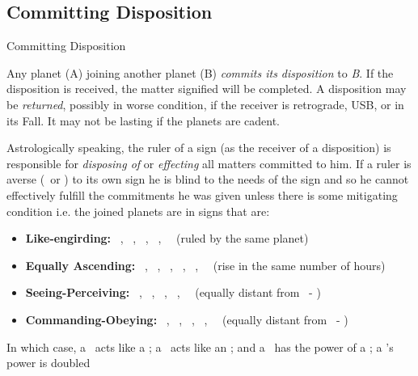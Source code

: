 \subsection{Committing Disposition}
\begin{frame}[t]{Committing Disposition}
\small
\begin{block}{}
Any planet (A) joining another planet (B) \textsl{commits its disposition} to \textsl{B}. If the disposition is received, the matter signified will be completed. A disposition may be \textsl{returned}, possibly in worse condition, if the receiver is retrograde, USB, or in its Fall.  It may not be lasting if the planets are cadent.
\end{block}

Astrologically speaking, the ruler of a sign (as the receiver of a disposition) is responsible for \textsl{disposing of} or \textsl{effecting} all matters committed to him. If a ruler is averse (\Semisextile\ or \Quincunx) to its own sign he is blind to the needs of the sign  and so he cannot effectively fulfill the commitments he was given unless there is some mitigating condition i.e. the joined planets are in signs that are:\footnotemark[1]
\vspace{-0.25cm}
\begin{itemize}
\item \textbf{Like-engirding:}  \Aries\ \Scorpio, \Taurus\  \Libra, \Gemini\ \Virgo, \Sagittarius\ \Pisces,  \Capricorn\ \Aquarius\ (ruled by the same planet)

\item \textbf{Equally Ascending:}  \Aries\ \Pisces, \Taurus\ \Aquarius, \Gemini\ \Capricorn, \Cancer\ \Sagittarius, \Leo\ \Scorpio, \Virgo\ \Libra\ (rise in the same number of hours)

\item \textbf{Seeing-Perceiving:} \Aries\ \Libra, \Taurus\ \Virgo, \Gemini\ \Leo, \Scorpio\ \Pisces, \Sagittarius\ \Aquarius\ (equally distant from \Cancer\ - \Capricorn)

\item \textbf{Commanding-Obeying:} \Taurus\ \Pisces, \Gemini\ \Aquarius, \Cancer\ \Capricorn, \Leo\ \Sagittarius, \Virgo\ \Scorpio\ (equally distant from \Aries\ - \Libra)
\end{itemize}
\vspace{-0.25cm}
In which case, a \Semisextile\ acts like a \Conjunction; a \Quincunx\ acts like an \Opposition; and a \Sextile\ has the power of a \Trine; a \Square's power is doubled

\end{frame}
